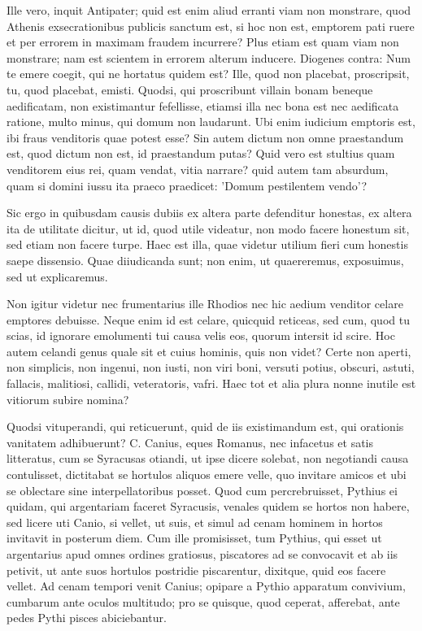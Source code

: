  Ille vero, inquit Antipater; quid est enim aliud erranti viam non monstrare, quod Athenis exsecrationibus publicis sanctum est, si hoc non est, emptorem pati ruere et per errorem in maximam fraudem incurrere? Plus etiam est quam viam non monstrare; nam est scientem in errorem alterum inducere. Diogenes contra: Num te emere coegit, qui ne hortatus quidem est? Ille, quod non placebat, proscripsit, tu, quod placebat, emisti. Quodsi, qui proscribunt villain bonam beneque aedificatam, non existimantur fefellisse, etiamsi illa nec bona est nec aedificata ratione, multo minus, qui domum non laudarunt. Ubi enim iudicium emptoris est, ibi fraus venditoris quae potest esse? Sin autem dictum non omne praestandum est, quod dictum non est, id praestandum putas? Quid vero est stultius quam venditorem eius rei, quam vendat, vitia narrare? quid autem tam absurdum, quam si domini iussu ita praeco praedicet: 'Domum pestilentem vendo'?

 Sic ergo in quibusdam causis dubiis ex altera parte defenditur honestas, ex altera ita de utilitate dicitur, ut id, quod utile videatur, non modo facere honestum sit, sed etiam non facere turpe. Haec est illa, quae videtur utilium fieri cum honestis saepe dissensio. Quae diiudicanda sunt; non enim, ut quaereremus, exposuimus, sed ut explicaremus.

 Non igitur videtur nec frumentarius ille Rhodios nec hic aedium venditor celare emptores debuisse. Neque enim id est celare, quicquid reticeas, sed cum, quod tu scias, id ignorare emolumenti tui causa velis eos, quorum intersit id scire. Hoc autem celandi genus quale sit et cuius hominis, quis non videt? Certe non aperti, non simplicis, non ingenui, non iusti, non viri boni, versuti potius, obscuri, astuti, fallacis, malitiosi, callidi, veteratoris, vafri. Haec tot et alia plura nonne inutile est vitiorum subire nomina?

 Quodsi vituperandi, qui reticuerunt, quid de iis existimandum est, qui orationis vanitatem adhibuerunt? C. Canius, eques Romanus, nec infacetus et satis litteratus, cum se Syracusas otiandi, ut ipse dicere solebat, non negotiandi causa contulisset, dictitabat se hortulos aliquos emere velle, quo invitare amicos et ubi se oblectare sine interpellatoribus posset. Quod cum percrebruisset, Pythius ei quidam, qui argentariam faceret Syracusis, venales quidem se hortos non habere, sed licere uti Canio, si vellet, ut suis, et simul ad cenam hominem in hortos invitavit in posterum diem. Cum ille promisisset, tum Pythius, qui esset ut argentarius apud omnes ordines gratiosus, piscatores ad se convocavit et ab iis petivit, ut ante suos hortulos postridie piscarentur, dixitque, quid eos facere vellet. Ad cenam tempori venit Canius; opipare a Pythio apparatum convivium, cumbarum ante oculos multitudo; pro se quisque, quod ceperat, afferebat, ante pedes Pythi pisces abiciebantur.

